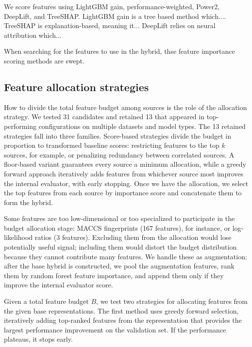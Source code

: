 {%
We score features using LightGBM gain, performance-weighted, Power2, DeepLift, and TreeSHAP. LightGBM gain is a tree based method which.... TreeSHAP is explanation-based, meaning it... DeepLift relies on neural attribution which... 

When searching for the features to use in the hybrid, thse feature importance scoring methods are swept.

\subsection{Feature allocation strategies}

How to divide the total feature budget among sources is the role of the allocation strategy. We tested 31 candidates and retained 13 that appeared in top-performing configurations on multiple datasets and model types. The 13 retained strategies fall into three families. Score-based strategies divide the budget in proportion to transformed baseline scores: restricting features to the top $k$ sources, for example, or penalizing redundancy between correlated sources. A floor-based variant guarantees every source a minimum allocation, while a greedy forward approach iteratively adds features from whichever source most improves the internal evaluator, with early stopping. Once we have the allocation, we select the top features from each source by importance score and concatenate them to form the hybrid.

Some features are too low-dimensional or too specialized to participate in the budget allocation stage: MACCS fingerprints (167 features), for instance, or log-likelihood ratios (3 features). Excluding them from the allocation would lose potentially useful signal; including them would distort the budget distribution because they cannot contribute many features. We handle these as augmentation: after the base hybrid is constructed, we pool the augmentation features, rank them by random forest feature importance, and append them only if they improve the internal evaluator score.

Given a total feature budget $B$, we test two strategies for allocating features from the given base representations. The first method uses greedy forward selection, iteratively adding top-ranked features from the representation that provides the largest performance improvement on the validation set. If the performance plateaus, it stops early.

}
